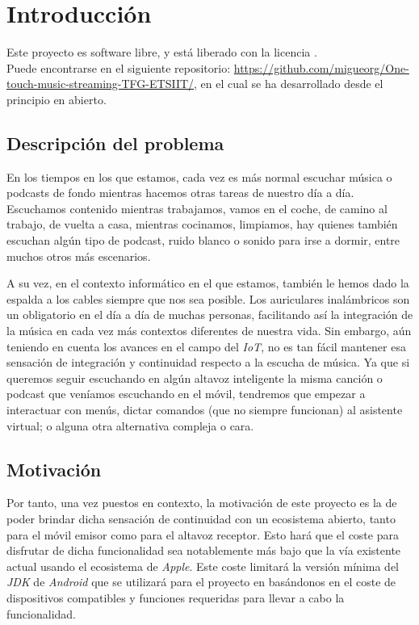 \chapter{Introducción}

Este proyecto es software libre, y está liberado con la licencia \cite{gplv3}.\\

Puede encontrarse en el siguiente repositorio:
\url{https://github.com/migueorg/One-touch-music-streaming-TFG-ETSIIT/}, en el
cual se ha desarrollado desde el principio en abierto.

\section{Descripción del problema}
En los tiempos en los que estamos, cada vez es más normal escuchar música o
podcasts de fondo mientras hacemos otras tareas de nuestro día a día. Escuchamos
contenido mientras trabajamos, vamos en el coche, de camino al trabajo, de
vuelta a casa, mientras cocinamos, limpiamos, hay quienes también escuchan algún
tipo de podcast, ruido blanco o sonido para irse a dormir, entre muchos otros
más escenarios. 

A su vez, en el contexto informático en el que estamos, también le hemos dado la
espalda a los cables siempre que nos sea posible. Los auriculares inalámbricos
son un obligatorio en el día a día de muchas personas, facilitando así la
integración de la música en cada vez más contextos diferentes de nuestra vida.
Sin embargo, aún teniendo en cuenta los avances en el campo del \emph{IoT}, no
es tan fácil mantener esa sensación de integración y continuidad respecto a la
escucha de música. Ya que si queremos seguir escuchando en algún altavoz
inteligente la misma canción o podcast que veníamos escuchando en el móvil,
tendremos que empezar a interactuar con menús, dictar comandos (que no siempre
funcionan) al asistente virtual; o alguna otra alternativa compleja o cara.\\

\section{Motivación}
Por tanto, una vez puestos en contexto, la motivación de este proyecto es la de
poder brindar dicha sensación de continuidad con un ecosistema abierto, tanto
para el móvil emisor como para el altavoz receptor. Esto hará que el coste para
disfrutar de dicha funcionalidad sea notablemente más bajo que la vía existente
actual usando el ecosistema de \emph{Apple}. Este coste limitará la versión
mínima del \emph{JDK} de \emph{Android} que se utilizará para el proyecto en
basándonos en el coste de dispositivos compatibles y funciones requeridas para
llevar a cabo la funcionalidad.

